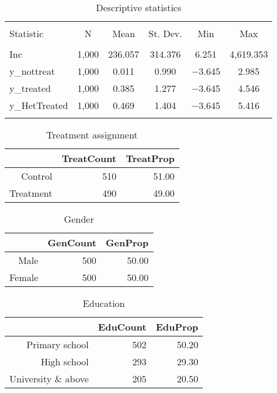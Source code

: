 \documentclass[11pt, a4paper]{article}\usepackage[]{graphicx}\usepackage[]{color}
\begin{document}
\begin{table}[!htbp] \centering 
  \caption{Descriptive statistics} 
  \label{} 
\begin{tabular}{@{\extracolsep{5pt}}lccccc} 
\\[-1.8ex]\hline 
\hline \\[-1.8ex] 
Statistic & \multicolumn{1}{c}{N} & \multicolumn{1}{c}{Mean} & \multicolumn{1}{c}{St. Dev.} & \multicolumn{1}{c}{Min} & \multicolumn{1}{c}{Max} \\ 
\hline \\[-1.8ex] 
Inc & 1,000 & 236.057 & 314.376 & 6.251 & 4,619.353 \\ 
y\_nottreat & 1,000 & 0.011 & 0.990 & $-$3.645 & 2.985 \\ 
y\_treated & 1,000 & 0.385 & 1.277 & $-$3.645 & 4.546 \\ 
y\_HetTreated & 1,000 & 0.469 & 1.404 & $-$3.645 & 5.416 \\ 
\hline \\[-1.8ex] 
\end{tabular} 
\end{table} 
\begin{table}[ht]
\centering
\caption{Treatment assignment} 
\begin{tabular}{rrr}
  \hline
 & TreatCount & TreatProp \\ 
  \hline
Control & 510 & 51.00 \\ 
  Treatment & 490 & 49.00 \\ 
   \hline
\end{tabular}
\end{table}
\begin{table}[ht]
\centering
\caption{Gender} 
\begin{tabular}{rrr}
  \hline
 & GenCount & GenProp \\ 
  \hline
Male & 500 & 50.00 \\ 
  Female & 500 & 50.00 \\ 
   \hline
\end{tabular}
\end{table}
\begin{table}[ht]
\centering
\caption{Education} 
\begin{tabular}{rrr}
  \hline
 & EduCount & EduProp \\ 
  \hline
Primary school & 502 & 50.20 \\ 
  High school & 293 & 29.30 \\ 
  University \& above & 205 & 20.50 \\ 
   \hline
\end{tabular}
\end{table}
\end{document}
